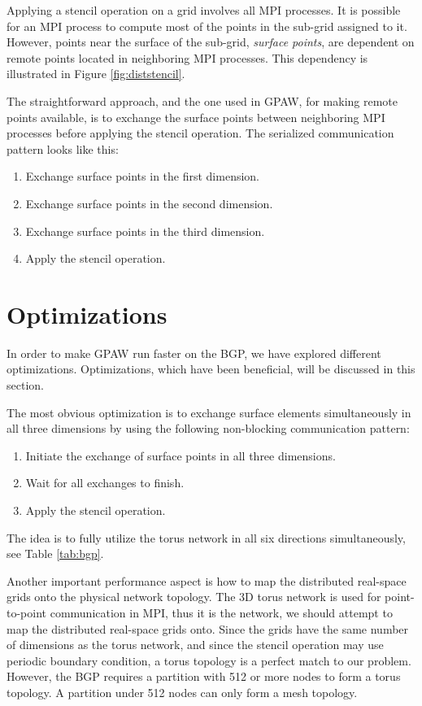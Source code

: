 \documentclass[preprint,3p,times,twocolumn]{elsarticle}
\begin{document}
Applying a stencil operation on a grid involves all MPI processes. It is possible for an MPI process to compute most of the points in the sub-grid assigned to it. However, points near the surface of the sub-grid, \emph{surface points}, are dependent on remote points located in neighboring MPI processes. This dependency is illustrated in Figure \ref{fig:diststencil}.

The straightforward approach, and the one used in GPAW, for making remote points available, is to exchange the surface points between neighboring MPI processes before applying the stencil operation. The serialized communication pattern looks like this:
\begin{enumerate}
 \item Exchange surface points in the first dimension.
 \item Exchange surface points in the second dimension.
 \item Exchange surface points in the third dimension.
 \item Apply the stencil operation.
\end{enumerate}

\section{Optimizations}\label{section:opt}
In order to make GPAW run faster on the BGP, we have explored different optimizations. Optimizations, which have been beneficial, will be discussed in this section.

The most obvious optimization is to exchange surface elements simultaneously in all three dimensions by using the following non-blocking communication pattern:
\begin{enumerate}
 \item Initiate the exchange of surface points in all three dimensions.
 \item Wait for all exchanges to finish.
 \item Apply the stencil operation.
\end{enumerate}
The idea is to fully utilize the torus network in all six directions simultaneously, see Table \ref{tab:bgp}.

Another important performance aspect is how to map the distributed real-space grids onto the physical network topology. The 3D torus network is used for point-to-point communication in MPI, thus it is the network, we should attempt to map the distributed real-space grids onto. Since the grids have the same number of dimensions as the torus network, and since the stencil operation may use periodic boundary condition, a torus topology is a perfect match to our problem. However, the BGP requires a partition with 512 or more nodes to form a torus topology. A partition under 512 nodes can only form a mesh topology.
\end{document}

